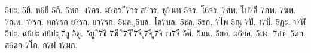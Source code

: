 {5บะ.
5ยี.
ห6ยี
5กี.
5หก.
ง7อร.
ม7อร.
ี7วร
ส7วร.
พู7นท
5จร.
โ6จร.
7ศพ.
โป7ลี
7ภพ.
7นพ.
7ณพ.
า7รก.
ทก7รก
ย7รก.
ยว7รก.
5มล.
ุ5บล.
โล7บล.
5ชล.
5ชก.
7โพ
5ณู
7ปี.
า7บี.
5ฏะ.
า7ฬี
5ปะ.
ฉ6ปะ
ส6ปะ
ู7ลู
5ตู.
5ยู.
ิ7ชิ
7ฆี.
ิ7จี
ี7จี
ุ7จี
ู7จี
เว7จี
5ศี.
5มน.
5ยอ.
ผ6ยอ.
5สง.
7สร.
5ดก.
ส6ดก
7โก.
ก7ฝ
า7มก.
}
